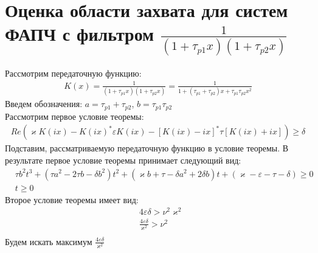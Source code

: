 \documentclass[a4paper]{article}
\begin{document}
\section{Оценка области захвата для систем ФАПЧ с фильтром $\frac{1}{(1+\tau_{p1}x)(1+\tau_{p2}x)}$}
 Рассмотрим передаточную функцию:
 \begin{equation}\label{filter1}
 \begin{aligned}
K(x) = \frac{1}{(1+\tau_{p1}x)(1+\tau_{p2}x)} = \frac{1}{1+(\tau_{p1}+\tau_{p2})x + \tau_{p1}\tau_{p2}x^2}
 \end{aligned}
\end{equation}
Введем обозначения: $a = \tau_{p1}+\tau_{p2}$, $b = \tau_{p1}\tau_{p2}$\\
Рассмотрим первое условие теоремы:
\begin{equation}
 \begin{aligned}
Re(\varkappa K(ix)-K(ix)^*\varepsilon K(ix)-[K(ix)-ix]^*\tau[K(ix)+ix])\geq\delta
 \end{aligned}
\end{equation}
Подставим, рассматриваемую передаточную функцию в условие теоремы. В результате первое условие теоремы принимает следующий вид:
\begin{equation}\label{first_condition}
 \begin{aligned}
&\tau b^2t^3 + (\tau a^2-2 \tau b - \delta b^2)t^2 + (\varkappa b+\tau-\delta a^2 + 2\delta b)t + (\varkappa-\varepsilon-\tau-\delta) \geq 0\\
&t \geq 0
 \end{aligned}
\end{equation}
Второе условие теоремы имеет вид: 
\begin{equation}\label{first_condition}
 \begin{aligned}
&4\varepsilon\delta > \nu^2\varkappa^2\\
&\frac{4\varepsilon\delta}{\varkappa^2} > \nu^2\\
 \end{aligned}
\end{equation}
Будем искать максимум $\frac{4\varepsilon\delta}{\varkappa^2}$
\end{document}
